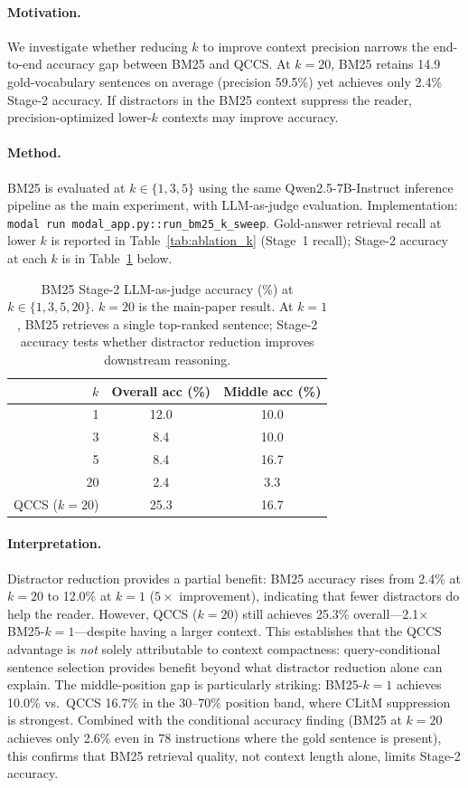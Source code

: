 \documentclass{article}
\begin{document}
\paragraph{Motivation.}
We investigate whether reducing $k$ to improve context precision narrows the
end-to-end accuracy gap between BM25 and QCCS.
At $k{=}20$, BM25 retains 14.9 gold-vocabulary sentences on average (precision 59.5\%)
yet achieves only 2.4\% Stage-2 accuracy. If distractors in the BM25 context
suppress the reader, precision-optimized lower-$k$ contexts may improve accuracy.

\paragraph{Method.}
BM25 is evaluated at $k \in \{1, 3, 5\}$ using the same Qwen2.5-7B-Instruct inference
pipeline as the main experiment, with LLM-as-judge evaluation. Implementation:
\texttt{modal run modal\_app.py::run\_bm25\_k\_sweep}. Gold-answer retrieval recall at
lower $k$ is reported in Table~\ref{tab:ablation_k} (Stage~1 recall);
Stage-2 accuracy at each $k$ is in Table~\ref{tab:ksweep} below.

\begin{table}[H]
\centering
\caption{BM25 Stage-2 LLM-as-judge accuracy (\%) at $k \in \{1,3,5,20\}$.
  $k{=}20$ is the main-paper result. At $k{=}1$, BM25 retrieves a single
  top-ranked sentence; Stage-2 accuracy tests whether distractor reduction improves
  downstream reasoning.}
\label{tab:ksweep}
\small
\begin{tabular}{@{}rcc@{}}
\toprule
$k$ & Overall acc (\%) & Middle acc (\%) \\
\midrule
1 & 12.0 & 10.0 \\
3 &  8.4 & 10.0 \\
5 &  8.4 & 16.7 \\
20 & 2.4 & 3.3 \\
QCCS ($k{=}20$) & 25.3 & 16.7 \\
\bottomrule
\end{tabular}
\end{table}

\paragraph{Interpretation.}
Distractor reduction provides a partial benefit: BM25 accuracy rises from 2.4\%
at $k{=}20$ to 12.0\% at $k{=}1$ ($5\times$ improvement), indicating that fewer
distractors do help the reader. However, QCCS ($k{=}20$) still achieves 25.3\%
overall---2.1$\times$ BM25-$k{=}1$---despite having a larger context. This
establishes that the QCCS advantage is \emph{not} solely attributable to context
compactness: query-conditional sentence selection provides benefit beyond what
distractor reduction alone can explain. The middle-position gap is particularly
striking: BM25-$k{=}1$ achieves 10.0\% vs.\ QCCS 16.7\% in the 30--70\%
position band, where CLitM suppression is strongest. Combined with the conditional
accuracy finding (BM25 at $k{=}20$ achieves only 2.6\% even in 78 instructions
where the gold sentence is present), this confirms that BM25 retrieval quality,
not context length alone, limits Stage-2 accuracy.
\end{document}

